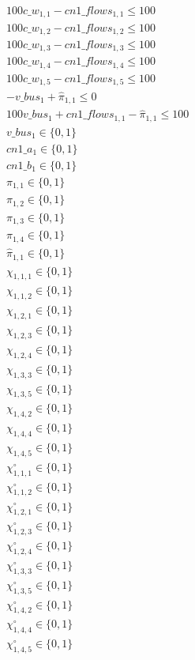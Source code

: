 \documentclass[]{article}
\begin{document}
\begin{align*}
 & 100 c\_w_{1,1} - cn1\_flows_{1,1} \leq 100\\
 & 100 c\_w_{1,2} - cn1\_flows_{1,2} \leq 100\\
 & 100 c\_w_{1,3} - cn1\_flows_{1,3} \leq 100\\
 & 100 c\_w_{1,4} - cn1\_flows_{1,4} \leq 100\\
 & 100 c\_w_{1,5} - cn1\_flows_{1,5} \leq 100\\
 & -v\_bus_{1} + \hat{\pi} _{1,1} \leq 0\\
 & 100 v\_bus_{1} + cn1\_flows_{1,1} - \hat{\pi} _{1,1} \leq 100\\
 & v\_bus_{1} \in \{0, 1\}\\
 & cn1\_a_{1} \in \{0, 1\}\\
 & cn1\_b_{1} \in \{0, 1\}\\
 & \pi_{1,1} \in \{0, 1\}\\
 & \pi_{1,2} \in \{0, 1\}\\
 & \pi_{1,3} \in \{0, 1\}\\
 & \pi_{1,4} \in \{0, 1\}\\
 & \hat{\pi} _{1,1} \in \{0, 1\}\\
 & \chi_{1,1,1} \in \{0, 1\}\\
 & \chi_{1,1,2} \in \{0, 1\}\\
 & \chi_{1,2,1} \in \{0, 1\}\\
 & \chi_{1,2,3} \in \{0, 1\}\\
 & \chi_{1,2,4} \in \{0, 1\}\\
 & \chi_{1,3,3} \in \{0, 1\}\\
 & \chi_{1,3,5} \in \{0, 1\}\\
 & \chi_{1,4,2} \in \{0, 1\}\\
 & \chi_{1,4,4} \in \{0, 1\}\\
 & \chi_{1,4,5} \in \{0, 1\}\\
 & \chi^\circ_{1,1,1} \in \{0, 1\}\\
 & \chi^\circ_{1,1,2} \in \{0, 1\}\\
 & \chi^\circ_{1,2,1} \in \{0, 1\}\\
 & \chi^\circ_{1,2,3} \in \{0, 1\}\\
 & \chi^\circ_{1,2,4} \in \{0, 1\}\\
 & \chi^\circ_{1,3,3} \in \{0, 1\}\\
 & \chi^\circ_{1,3,5} \in \{0, 1\}\\
 & \chi^\circ_{1,4,2} \in \{0, 1\}\\
 & \chi^\circ_{1,4,4} \in \{0, 1\}\\
 & \chi^\circ_{1,4,5} \in \{0, 1\}\\

\end{align*}
\end{document}
